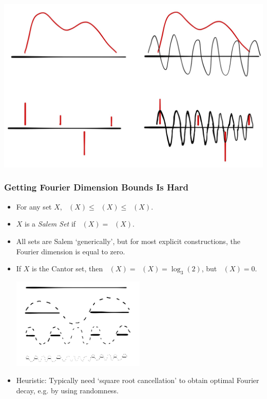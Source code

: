 \documentclass[usenames,dvipsnames,handout]{beamer}
\DeclareMathOperator{\fordim}{\text{dim}_{\textbf{F}}}
\DeclareMathOperator{\hausdim}{\text{dim}_{\textbf{H}}}
\DeclareMathOperator{\minkdim}{\text{dim}_{\textbf{M}}}
\begin{document}
\begin{frame}
    \includegraphics[width=\textwidth]{../Images/FourierDimension}
\end{frame}



\begin{frame}
    \frametitle{Getting Fourier Dimension Bounds Is Hard}

    \begin{itemize}
        \item For any set $X$, $\fordim(X) \leq \hausdim(X) \leq \minkdim(X)$.

        \pause
        \item $X$ is a \emph{Salem Set} if $\fordim(X) = \hausdim(X)$.

        \pause
        \item All sets are Salem `generically', but for most explicit constructions, the Fourier dimension is equal to zero.

        \pause
        \item If $X$ is the Cantor set, then $\hausdim(X) = \minkdim(X) = \log_3(2)$, but $\fordim(X) = 0$.

        \begin{center}
        \includegraphics[width=0.5\textwidth]{../Images/CantorSetFourier}
        \end{center}

        \pause
        \item Heuristic: Typically need `square root cancellation' to obtain optimal Fourier decay, e.g. by using randomness.
    \end{itemize}
\end{frame}
\end{document}
